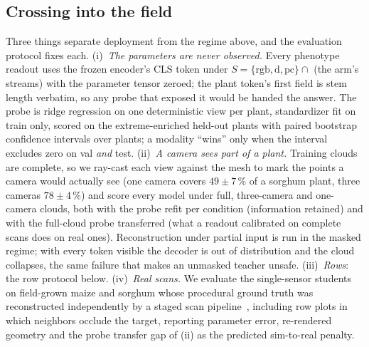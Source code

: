 \subsection{Crossing into the field}
\label{sec:field}

Three things separate deployment from the regime above, and the evaluation
protocol fixes each. (i)~\emph{The parameters are never observed.} Every
phenotype readout uses the frozen encoder's CLS token under
$S=\{\mathrm{rgb},\mathrm{d},\mathrm{pc}\}\cap$ (the arm's streams) with the
parameter tensor zeroed; the plant token's first field is stem length verbatim,
so any probe that exposed it would be handed the answer. The probe is ridge
regression on one deterministic view per plant, standardizer fit on train
only, scored on the extreme-enriched held-out plants with paired bootstrap
confidence intervals over plants; a modality ``wins'' only when the interval
excludes zero on val \emph{and} test. (ii)~\emph{A camera sees part of a
plant.} Training clouds are complete, so we ray-cast each view against the mesh
to mark the points a camera would actually see (one camera covers
$49\pm7\,\%$ of a sorghum plant, three cameras $78\pm4\,\%$) and score every
model under full, three-camera and one-camera clouds, both with the probe
refit per condition (information retained) and with the full-cloud probe
transferred (what a readout calibrated on complete scans does on real ones).
Reconstruction under partial input is run in the masked regime; with every
token visible the decoder is out of distribution and the cloud collapses, the
same failure that makes an unmasked teacher unsafe. (iii)~\emph{Rows}: the row
protocol below. (iv)~\emph{Real scans.}
We evaluate the single-sensor students on field-grown maize and sorghum whose
procedural ground truth was reconstructed independently by a staged scan
pipeline~\cite{hadadi2025vlm,kimara2025maizefield3d}, including row plots in
which neighbors occlude the target, reporting parameter error, re-rendered
geometry and the probe transfer gap of (ii) as the predicted sim-to-real
penalty. 

